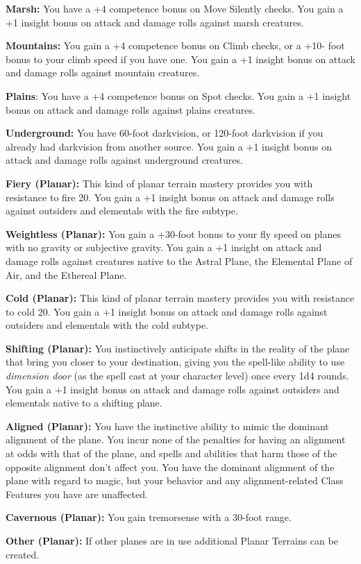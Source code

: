 \textbf{Marsh:} You have a +4 competence bonus on Move Silently checks. You gain 
a +1 insight bonus on attack and damage rolls against marsh creatures.

\textbf{Mountains:} You gain a +4 competence bonus on Climb checks, or a +10- foot 
bonus to your climb speed if you have one. You gain a +1 insight bonus on attack 
and damage rolls against mountain creatures.

\textbf{Plains}: You have a +4 competence bonus on Spot checks. You gain a +1 insight 
bonus on attack and damage rolls against plains creatures.

\textbf{Underground: }You have 60-foot darkvision, or 120-foot darkvision if you 
already had darkvision from another source. You gain a +1 insight bonus on attack 
and damage rolls against underground creatures.

\textbf{Fiery (Planar):} This kind of planar terrain mastery provides you with 
resistance to fire 20. You gain a +1 insight bonus on attack and damage rolls against 
outsiders and elementals with the fire subtype.

\textbf{Weightless (Planar):} You gain a +30-foot bonus to your fly speed on planes 
with no gravity or subjective gravity. You gain a +1 insight on attack and damage 
rolls against creatures native to the Astral Plane, the Elemental Plane of Air, 
and the Ethereal Plane.

\textbf{Cold (Planar):} This kind of planar terrain mastery provides you with resistance 
to cold 20. You gain a +1 insight bonus on attack and damage rolls against outsiders 
and elementals with the cold subtype.

\textbf{Shifting (Planar):} You instinctively anticipate shifts in the reality 
of the plane that bring you closer to your destination, giving you the spell-like 
ability to use \textit{dimension door }(as the spell cast at your character level) 
once every 1d4 rounds. You gain a +1 insight bonus on attack and damage rolls against 
outsiders and elementals native to a shifting plane.

\textbf{Aligned (Planar):} You have the instinctive ability to mimic the dominant 
alignment of the plane. You incur none of the penalties for having an alignment 
at odds with that of the plane, and spells and abilities that harm those of the 
opposite alignment don't affect you. You have the dominant alignment of the plane 
with regard to magic, but your behavior and any alignment-related Class Features 
you have are unaffected.

\textbf{Cavernous (Planar):} You gain tremorsense with a 30-foot range.

\textbf{Other (Planar):} If other planes are in use additional Planar Terrains 
can be created.
